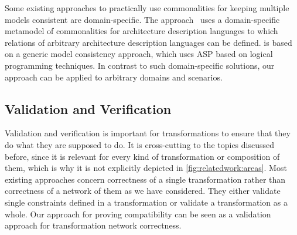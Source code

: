Some existing approaches to practically use commonalities for keeping multiple models consistent are domain-specific.
The \dually approach~\cite{malavolta2010ADLInteroperability-TSE, eramo2012Dually-SoSym} uses a domain-specific metamodel of commonalities for architecture description languages to which relations of arbitrary architecture description languages can be defined.
\dually is based on a generic model consistency approach, which uses \gls{ASP} based on logical programming techniques.
In contrast to such domain-specific solutions, our \commonalities approach can be applied to arbitrary domains and scenarios.


\subsection{Validation and Verification}

Validation and verification is important for transformations to ensure that they do what they are supposed to do.
It is cross-cutting to the topics discussed before, since it is relevant for every kind of transformation or composition of them, which is why it is not explicitly depicted in \autoref{fig:relatedwork:areas}.
Most existing approaches concern correctness of a single transformation rather than correctness of a network of them as we have considered.
They either validate single constraints defined in a transformation or validate a transformation as a whole.
Our approach for proving compatibility can be seen as a validation approach for transformation network correctness.

